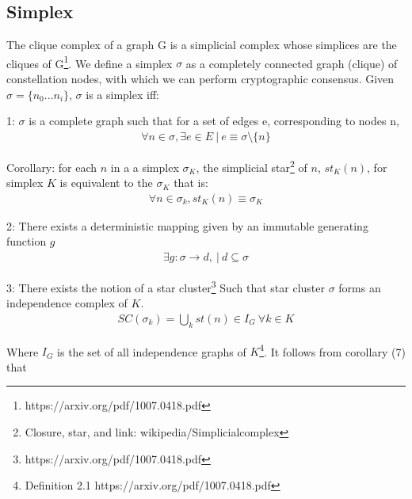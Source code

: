 \documentclass{article}
\begin{document}
\subsection{Simplex}
The clique complex of a graph G is a simplicial complex whose simplices are the cliques of G\footnote{https://arxiv.org/pdf/1007.0418.pdf}. We define a simplex $\sigma$ as a completely connected graph (clique) of constellation nodes, with which we can perform cryptographic consensus. Given $\sigma = \{n_0 \dots n_i\}$, $\sigma$ is a simplex iff:

1: $\sigma$ is a complete graph such that for a set of edges e, corresponding to nodes n,
\begin{equation} \label{eq1}
\begin{split}
\forall n \in \sigma, \exists e \in E \ | \ e \equiv \sigma \setminus \{n\} 
\end{split}
\end{equation}

Corollary: for each $n$ in a a simplex $\sigma_K$, the simplicial star\footnote{Closure, star, and link: wikipedia/Simplicialcomplex} of $n$, $st_K(n)$, for simplex $K$ is equivalent to the $\sigma_K$ that is:
\begin{equation} \label{eq1}
\begin{split}
\forall n \in \sigma_k, st_K(n) \equiv \sigma_K
\end{split}
\end{equation}

2: There exists a deterministic mapping given by an immutable generating function $g$
\begin{equation} \label{eq1}
\begin{split}
\exists g: \sigma \rightarrow d, \ | \ d \subseteq \sigma
\end{split}
\end{equation}

3: There exists the notion of a star cluster\footnote{https://arxiv.org/pdf/1007.0418.pdf} Such that star cluster $\sigma$ forms an independence complex of $K$.
\begin{equation} \label{eq1}
\begin{split}
SC(\sigma_k) = \bigcup_k st(n) \in I_G \ \forall k \in K
\end{split}
\end{equation}

Where $I_G$ is the set of all independence graphs of $K$\footnote{Definition 2.1 https://arxiv.org/pdf/1007.0418.pdf}. It follows from corollary (7) that
\end{document}
